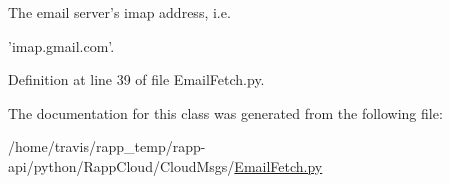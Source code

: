 The email server's imap address, i.\-e. 

'imap.\-gmail.\-com'. 

Definition at line 39 of file Email\-Fetch.\-py.



The documentation for this class was generated from the following file\-:\begin{DoxyCompactItemize}
\item 
/home/travis/rapp\-\_\-temp/rapp-\/api/python/\-Rapp\-Cloud/\-Cloud\-Msgs/\hyperlink{EmailFetch_8py}{Email\-Fetch.\-py}\end{DoxyCompactItemize}
